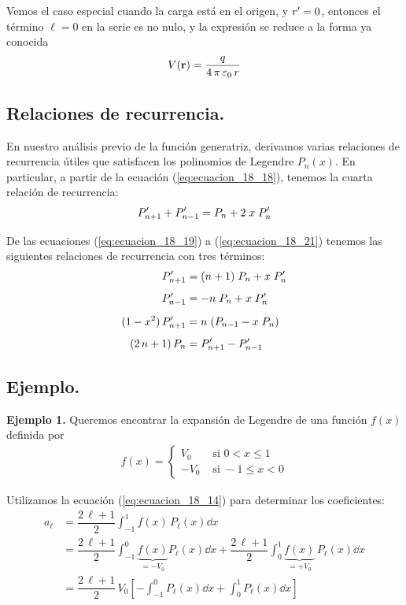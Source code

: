 Vemos el caso especial cuando la carga está en el origen, y ${r}^{\prime} = 0$, entonces el término $\ell =0$ en la serie es no nulo, y la expresión se reduce a la forma ya conocida 
\begin{align*}
V(\vb{r}) = \dfrac{q}{4 \, \pi \, \varepsilon_{0} \, r}
\end{align*}

\subsection{Relaciones de recurrencia.}

En nuestro análisis previo de la función generatriz, derivamos varias relaciones de recurrencia útiles que satisfacen los polinomios de Legendre $P_{n} (x)$. En particular, a partir de la ecuación (\ref{eq:ecuacion_18_18}), tenemos la cuarta relación de recurrencia:
\begin{align*}
{P}^{\prime}_{n+1} + {P}^{\prime}_{n-1} =  P_{n} + 2 \; x \; {P}^{\prime}_{n}
\end{align*}

De las ecuaciones (\ref{eq:ecuacion_18_19}) a (\ref{eq:ecuacion_18_21}) tenemos las siguientes relaciones de recurrencia con tres términos:
\begin{align*}
{P}^{\prime}_{n+1} &= (n+1) \; P_{n} + x \; {P}^{\prime}_{n} \\[0.5em]
{P}^{\prime}_{n-1} &= -n \; P_{n} + x \; {P}^{\prime}_{n} \\[0.5em]
(1 - x^{2}) \, {P}^{\prime}_{n+1} &= n \; (P_{n-1} - x \; P_{n}) \\[0.5em]
(2 \, n + 1) \, P_{n} &= {P}^{\prime}_{n+1} - {P}^{\prime}_{n-1}
\end{align*}

\subsection{Ejemplo.}
\textbf{Ejemplo 1.} Queremos encontrar la expansión de Legendre de una función $f(x)$ definida por
\begin{align*}
f(x) = \begin{cases}
V_{0} & \mbox{ si } 0 < x \leq 1 \\[0.5em]
- V_{0} & \mbox{ si } -1 \leq x < 0
\end{cases}
\end{align*}

Utilizamos la ecuación (\ref{eq:ecuacion_18_14}) para determinar los coeficientes:
\begin{align*}
a_{\ell} &= \dfrac{2 \, \ell + 1}{2} \int_{-1}^{1} f(x) \, P_{\ell} (x) \dd{x} \\[0.5em]
&= \dfrac{2 \, \ell + 1}{2} \int_{-1}^{0} \underbrace{f(x)}_{=-V_0}  P_{\ell} (x) \dd{x} + \dfrac{2 \, \ell + 1}{2} \int_{0}^{1} \underbrace{f(x)}_{=+V_0} \, P_{\ell} (x) \dd{x} \\[0.5em]
&= \dfrac{2 \, \ell + 1}{2} \, V_{0} \left[ - \int_{-1}^{0} P_{\ell} (x) \dd{x} + \int_{0}^{1} P_{\ell} (x) \dd{x} \right]
\end{align*}

